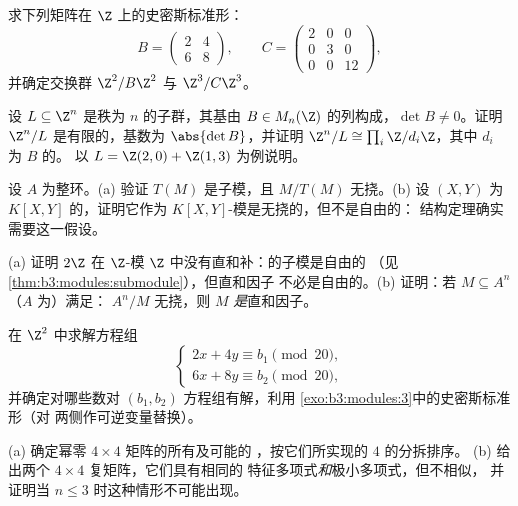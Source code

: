 \begin{exercise}[$\star$]\label{exo:b3:modules:3}
求下列矩阵在 $\Z$ 上的史密斯标准形：
\[
B = \begin{pmatrix} 2 & 4\\ 6 & 8 \end{pmatrix},
\qquad
C = \begin{pmatrix} 2 & 0 & 0\\ 0 & 3 & 0\\ 0 & 0 & 12
\end{pmatrix},
\]
并确定交换群 $\Z^2/B\Z^2$ 与 $\Z^3/C\Z^3$。
\end{exercise}

\begin{exercise}[$\star\star$]\label{exo:b3:modules:4}
设 $L \subseteq \Z^n$ 是秩为 $n$ 的子群，其基由
$B \in M_n(\Z)$ 的列构成，$\det B \neq 0$。证明
$\Z^n/L$ 是有限的，基数为 $\abs{\det B}$，并证明 $\Z^n/L
\cong \prod_i \Z/d_i\Z$，其中 $d_i$ 为 $B$ 的。
以 $L = \Z(2,0) + \Z(1,3)$ 为例说明。
\end{exercise}

\begin{exercise}[$\star\star$]\label{exo:b3:modules:5}
设 $A$ 为整环。(a) 验证 $T(M)$ 是子模，且
$M/T(M)$ 无挠。(b) 设 $(X, Y)$ 为 $K[X,Y]$ 的，证明它作为
$K[X,Y]$-模是无挠的，但不是自由的：
结构定理确实需要这一假设。
\end{exercise}

\begin{exercise}[$\star\star$]\label{exo:b3:modules:6}
(a) 证明 $2\Z$ 在 $\Z$-模
$\Z$ 中没有直和补：的子模是自由的
（见\cref{thm:b3:modules:submodule}），但直和因子
不必是自由的。(b) 证明：若 $M \subseteq A^n$（$A$ 为）满足：
$A^n/M$ 无挠，则 $M$ \emph{是}直和因子。
\end{exercise}

\begin{exercise}[$\star\star$]\label{exo:b3:modules:7}
在 $\Z^2$ 中求解方程组
\[
\begin{cases}
2x + 4y \equiv b_1 \pmod{20},\\
6x + 8y \equiv b_2 \pmod{20},
\end{cases}
\]
并确定对哪些数对 $(b_1, b_2)$ 方程组有解，利用
\cref{exo:b3:modules:3}中的史密斯标准形（对
两侧作可逆变量替换）。
\end{exercise}

\begin{exercise}[$\star\star$]\label{exo:b3:modules:8}
(a) 确定幂零 $4 \times 4$ 矩阵的所有及可能的
，按它们所实现的
$4$ 的分拆排序。
(b) 给出两个 $4\times4$ 复矩阵，它们具有相同的
特征多项式\emph{和}极小多项式，但不相似，
并证明当 $n \leq 3$ 时这种情形不可能出现。
\end{exercise}

